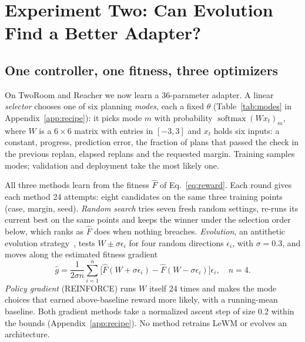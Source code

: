 \documentclass[sigconf,nonacm]{acmart}
\begin{document}



\section{Experiment Two: Can Evolution Find a Better Adapter?}\label{sec:exp2}
\subsection{One controller, one fitness, three optimizers}
On TwoRoom and Reacher we now learn a 36-parameter adapter. A linear
\emph{selector} chooses one of six planning \emph{modes}, each a fixed
$\theta$ (Table~\ref{tab:modes} in Appendix~\ref{app:recipe}): it picks mode
$m$ with probability $\operatorname{softmax}(Wx_t)_m$, where $W$ is a
$6\times6$ matrix with entries in $[-3,3]$ and $x_t$ holds six inputs: a
constant, progress, prediction error, the fraction of plans that passed the
check in the previous replan, elapsed replans and the requested margin.
Training samples modes; validation and deployment take the most likely one.

All three methods learn from the fitness $\hat F$ of Eq.~\ref{eq:reward}.
Each round gives each method 24 attempts: eight
candidates on the same three training points (case, margin, seed).
\emph{Random search} tries seven fresh random settings, re-runs its current
best on the same points and keeps the winner under the selection order
below, which ranks as $\hat F$ does when nothing breaches.
\emph{Evolution}, an antithetic evolution strategy~\cite{salimans2017es},
tests $W\pm\sigma\epsilon_i$ for four random directions $\epsilon_i$, with
$\sigma=0.3$, and moves along the estimated fitness gradient
\begin{equation}\label{eq:es}
\hat g=\frac{1}{2\sigma n}\sum_{i=1}^{n}
\bigl[\hat F(W+\sigma\epsilon_i)-\hat F(W-\sigma\epsilon_i)\bigr]\epsilon_i,
\quad n=4.
\end{equation}
\emph{Policy gradient} (REINFORCE) runs $W$ itself 24 times and makes the
mode choices that earned above-baseline reward more likely, with a
running-mean baseline. Both gradient methods take a normalized ascent step
of size 0.2 within the bounds (Appendix~\ref{app:recipe}). No method
retrains LeWM or evolves an architecture.
\end{document}
